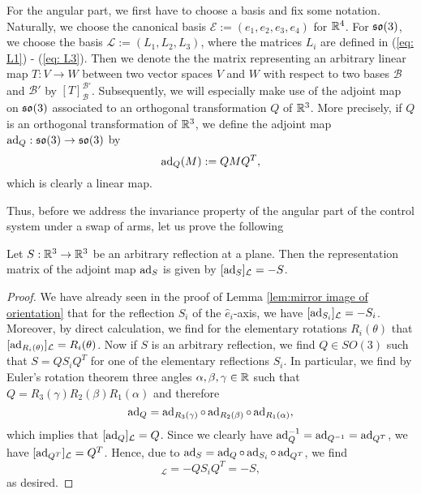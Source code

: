 For the angular part, we first have to choose a basis and fix some notation. Naturally, we choose the canonical basis $\mathcal{E} := (e_1, e_2, e_3, e_4)$ for $\mathbb{R}^4$. For $\mathfrak{so}(3)$, we choose the basis $\mathcal{L} := (L_1, L_2, L_3)$, where the matrices $L_i$ are defined in (\ref{eq: L1}) - (\ref{eq: L3}). Then we denote the the matrix representing an arbitrary linear map $T: V \to W$ between two vector spaces $V$ and $W$ with respect to two bases $\mathcal{B}$ and $\mathcal{B}'$ by $[T]_{\mathcal{B}}^{\mathcal{B}'}$. Subsequently, we will especially make use of the adjoint map on $\mathfrak{so}(3)$ associated to an orthogonal transformation $Q$ of $\mathbb{R}^3$. More precisely, if $Q$ is an orthogonal transformation of $\mathbb{R}^3$, we define the adjoint map $\operatorname{ad}_Q : \mathfrak{so}(3) \to \mathfrak{so}(3)$ by
\begin{equation}
\operatorname{ad}_Q(M) := Q M Q^T,
\end{equation}
which is clearly a linear map.

Thus, before we address the invariance property of the angular part of the control system under a swap of arms, let us prove the following

\begin{lemma}
\label{lem:representation matrix of adjoint of reflection}
Let $S: \mathbb{R}^3 \to \mathbb{R}^3$ be an arbitrary reflection at a plane. Then the representation matrix of the adjoint map $\operatorname{ad}_S$ is given by $[\operatorname{ad}_S]_{\mathcal{L}} = -S$.
\end{lemma}


\begin{proof}
We have already seen in the proof of Lemma \ref{lem:mirror image of orientation} that for the reflection $S_i$ of the $\hat{e}_i$-axis, we have $[\operatorname{ad}_{S_i}]_{\mathcal{L}} = -S_i$. Moreover, by direct calculation, we find for the elementary rotations $R_i(\theta)$ that $[\operatorname{ad}_{R_i(\theta)}]_{\mathcal{L}} = R_{i}(\theta)$. Now if $S$ is an arbitrary reflection, we find $Q \in SO(3)$ such that $S = Q S_i Q^T$ for one of the elementary reflections $S_i$. In particular, we find by Euler's rotation theorem three angles $\alpha, \beta, \gamma \in \mathbb{R}$ such that $Q = R_{3}(\gamma) R_{2}(\beta) R_{1}(\alpha)$ and therefore
\begin{equation}
\operatorname{ad}_Q = \operatorname{ad}_{R_3(\gamma)} \circ \operatorname{ad}_{R_{2}(\beta)} \circ \operatorname{ad}_{R_{1}(\alpha)},
\end{equation}
which implies that $[\operatorname{ad}_{Q}]_{\mathcal{L}} = Q$. Since we clearly have $\operatorname{ad}_{Q}^{-1} = \operatorname{ad}_{Q^{-1}} = \operatorname{ad}_{Q^T}$, we have $[\operatorname{ad}_{Q^T}]_{\mathcal{L}} = Q^T$. Hence, due to $\operatorname{ad}_S = \operatorname{ad}_Q \circ \operatorname{ad}_{S_i} \circ \operatorname{ad}_{Q^T}$, we find
\begin{equation}
[S]_{\mathcal{L}} = - Q S_i Q^T = -S,
\end{equation}
as desired.
\end{proof}

